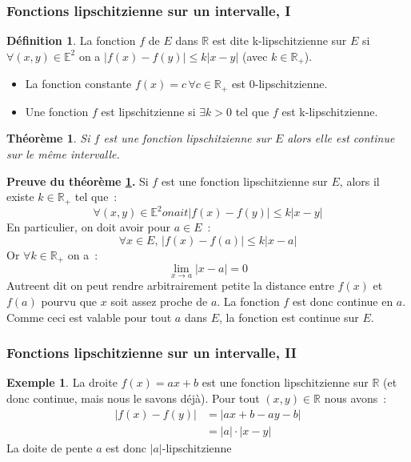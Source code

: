 \documentclass[10pt,notheorems]{beamer}
\theoremstyle{plain}
\newtheorem{theorem}{Théorème}
\theoremstyle{definition} %
\newtheorem{definition}{Définition}
\newtheorem{example}{Exemple}
\begin{document}
\begin{frame}
  \frametitle{Fonctions lipschitzienne sur un intervalle, I}

  \hypertarget{slide_fonction_lipschitzienne}{}

  \begin{definition}
    La fonction $f$ de $E$ dans $\mathbb R$ est dite k-lipschitzienne sur $E$ si $\forall (x,y)\in\mathbb E^2$ on a $|f(x)-f(y)|\leq k|x-y|$ (avec $k\in\mathbb R_+$).
  \end{definition}

  \bigskip

  \begin{itemize}
  \item La fonction constante $f(x)=c\,\forall c\in\mathbb R_+$ est 0-lipschitzienne.\newline
  \item Une fonction $f$ est lipschitzienne si $\exists k>0$ tel que $f$ est k-lipschitzienne.\newline
  \end{itemize}

  \begin{theorem}\label{thm:lipschitz}
    Si $f$ est une fonction lipschitzienne sur $E$ alors elle est continue sur le même intervalle.
  \end{theorem}

\end{frame}


\begin{notes}

  \textbf{Preuve du théorème \hyperlink{slide_fonction_lipschitzienne}{\ref{thm:lipschitz}}.} Si $f$ est une fonction lipschitzienne sur $E$, alors il existe $k\in\mathbb R_+$ tel que~:
  \[
    \forall (x,y)\in\mathbb E^2 on ait |f(x)-f(y)|\leq k|x-y|
  \]
  En particulier, on doit avoir pour $a\in E$~:
  \[
    \forall x\in E,\, |f(x)-f(a)|\leq k|x-a|
  \]
  Or $\forall k\in\mathbb R_+$ on a~:
  \[
    \lim_{x\rightarrow a} |x-a| = 0
  \]
  Autreent dit on peut rendre arbitrairement petite la distance entre $f(x)$ et $f(a)$ pourvu que $x$ soit assez proche de $a$. La fonction $f$ est donc continue en $a$. Comme ceci est valable pour tout $a$ dans $E$, la fonction est continue sur $E$.

\end{notes}


\begin{frame}
  \frametitle{Fonctions lipschitzienne sur un intervalle, II}

  \begin{example}
    La droite $f(x) = ax+b$ est une fonction lipschitzienne sur
    $\mathbb R$ (et donc continue, mais nous le savons déjà). Pour
    tout $(x,y)\in\mathbb R$ nous avons~:
    \[
      \begin{split}
        |f(x)-f(y)| &= |ax+b-ay-b|\\
        &= |a|\cdot|x-y|
      \end{split}
    \]
    La doite de pente $a$ est donc $|a|$-lipschitzienne
  \end{example}

\end{frame}
\end{document}
